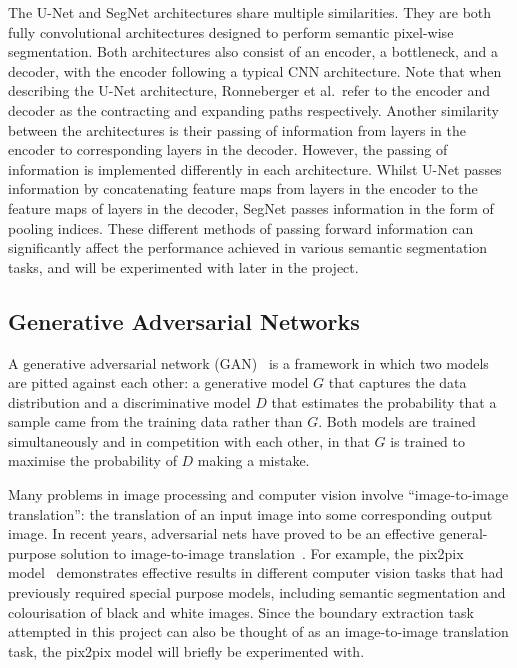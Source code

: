 The U-Net and SegNet architectures share multiple similarities. They are both fully convolutional architectures designed to perform semantic pixel-wise segmentation. Both architectures also consist of an encoder, a bottleneck, and a decoder, with the encoder following a typical CNN architecture. Note that when describing the U-Net architecture, Ronneberger et al.\ refer to the encoder and decoder as the contracting and expanding paths respectively. Another similarity between the architectures is their passing of information from layers in the encoder to corresponding layers in the decoder. However, the passing of information is implemented differently in each architecture. Whilst U-Net passes information by concatenating feature maps from layers in the encoder to the feature maps of layers in the decoder, SegNet passes information in the form of pooling indices. These different methods of passing forward information can significantly affect the performance achieved in various semantic segmentation tasks, and will be experimented with later in the project.

\subsection{Generative Adversarial Networks}

A generative adversarial network (GAN)~\cite{gans} is a framework in which two models are pitted against each other: a generative model $G$ that captures the data distribution and a discriminative model $D$ that estimates the probability that a sample came from the training data rather than $G$. Both models are trained simultaneously and in competition with each other, in that $G$ is trained to maximise the probability of $D$ making a mistake.

Many problems in image processing and computer vision involve ``image-to-image translation'': the translation of an input image into some corresponding output image. In recent years, adversarial nets have proved to be an effective general-purpose solution to image-to-image translation~\cite{gansoverview}. For example, the pix2pix model~\cite{pix2pix} demonstrates effective results in different computer vision tasks that had previously required special purpose models, including semantic segmentation and colourisation of black and white images. Since the boundary extraction task attempted in this project can also be thought of as an image-to-image translation task, the pix2pix model will briefly be experimented with.

